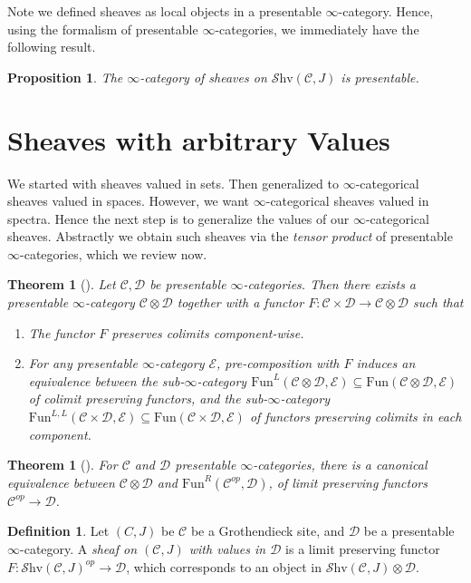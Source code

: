 \documentclass[10pt]{amsart}
\newcommand{\C}{\mathscr{C}}
\newcommand{\D}{\mathscr{D}}
\newcommand{\E}{\mathscr{E}}
\newcommand{\Fun}{\mathrm{Fun}}
\newcommand{\Shv}{\mathscr{S}\mathrm{hv}}
\newtheorem{theorem}[equation]{Theorem}
\newtheorem{proposition}[equation]{Proposition}
\theoremstyle{definition}
\newtheorem{definition}[equation]{Definition}
\theoremstyle{remark}
\numberwithin{equation}{section}
\begin{document}
	Note we defined sheaves as local objects in a presentable $\infty$-category. Hence, using the formalism of presentable $\infty$-categories, we immediately have the following result. 
	
	\begin{proposition}
		The $\infty$-category of sheaves on $\Shv(\C,J)$ is presentable.
	\end{proposition}
	
\section{Sheaves with arbitrary Values}
We started with sheaves valued in sets. Then generalized to $\infty$-categorical sheaves valued in spaces. However, we want $\infty$-categorical sheaves valued in spectra. Hence the next step is to generalize the values of our $\infty$-categorical sheaves. Abstractly we obtain such sheaves via the \emph{tensor product} of presentable $\infty$-categories, which we review now.

\begin{theorem}[{\cite[Proposition 4.8.1.15]{lurie2017ha}}]
  Let $\C, \D$ be presentable $\infty$-categories. Then there exists a presentable $\infty$-category $\C \otimes \D$ together with a functor $F:\C\times\D\rightarrow\C\otimes\D$ such that 
  \begin{enumerate}
	\item The functor $F$ preserves colimits component-wise.
	\item For any presentable $\infty$-category $\E$, pre-composition with $F$ induces an equivalence between the sub-$\infty$-category $\Fun^L(\C \otimes \D , \E)\subseteq\Fun(\C \otimes \D , \E)$ of colimit preserving functors, and the sub-$\infty$-category $\Fun^{L,L}(\C \times \D, \E)\subseteq\Fun(\C\times\D,\E)$ of functors preserving colimits in each component. 
  \end{enumerate}
\end{theorem}
\begin{theorem}[{\cite[Proposition 4.8.1.17]{lurie2017ha}}]For $\C$ and $\D$ presentable $\infty$-categories, there is a canonical equivalence between $\C\otimes\D$ and $\Fun^R(\C^{op},\D)$, of limit preserving functors $\C^{op}\to\D$. 
\end{theorem}
\begin{definition}
  Let $(C,J)$ be $\C$ be a Grothendieck site, and $\D$ be a presentable $\infty$-category. A \emph{sheaf on $(\C,J)$ with values in $\D$} is a limit preserving functor $F\colon \Shv(\C,J)^{op} \to \D$, which corresponds to an object in $\Shv(\C,J) \otimes \D$. 
\end{definition}
\end{document}
